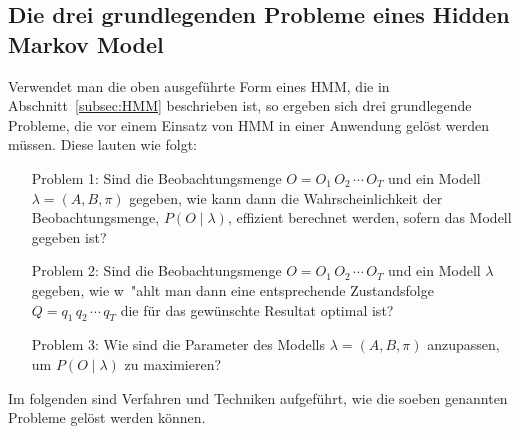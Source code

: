 \subsection[Die drei grundlegenden Probleme eines Hidden Markov Model]{Die drei grundlegenden Probleme eines Hidden
\label{subsec:HMMProbleme}
 Markov Model }
Verwendet man die oben ausgef\"uhrte Form eines \acrshort{HMM}, die in Abschnitt~\ref{subsec:HMM} beschrieben ist, so ergeben sich drei grundlegende Probleme, die vor einem Einsatz von \gls{HMM} in einer Anwendung gel\"ost werden m\"ussen. Diese lauten wie folgt:
\begin{enumerate}
\item[Problem 1:] Sind die Beobachtungsmenge $O = O_1 \, O_2 \, \cdots \, O_T$ und ein Modell $\lambda = (A, B, \pi)$ gegeben, wie kann dann die Wahrscheinlichkeit der Beobachtungsmenge, $P( O \mid \lambda)$, effizient berechnet werden, sofern das Modell gegeben ist?
\item[Problem 2:] Sind die Beobachtungsmenge $O = O_1 \, O_2 \, \cdots \, O_T$ und ein Modell $\lambda$ gegeben, wie w\
"ahlt man dann eine entsprechende Zustandsfolge $Q = q_1 \, q_2 \, \cdots \, q_T$ die f\"ur das gew\"unschte Resultat optimal ist?
\item[Problem 3:] Wie sind die Parameter des Modells $\lambda =(A, B, \pi)$ anzupassen, um $P ( O \mid \lambda)$ zu maximieren?
\end{enumerate}
Im folgenden sind Verfahren und Techniken aufgef\"uhrt, wie die soeben genannten Probleme gel\"ost werden k\"onnen.

